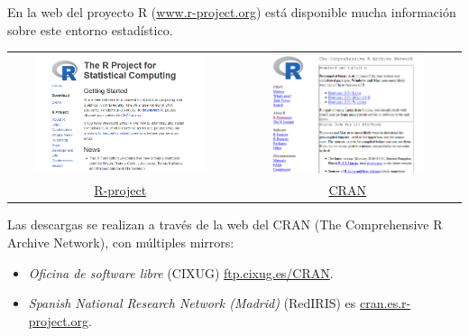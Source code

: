 \documentclass[]{book}
\providecommand{\tightlist}{%
  \setlength{\itemsep}{0pt}\setlength{\parskip}{0pt}}
\begin{document}
En la web del proyecto R
(\href{http://www.r-project.org}{www.r-project.org}) está disponible
mucha información sobre este entorno estadístico.

\begin{longtable}[]{@{}cc@{}}
\toprule
\endhead
\includegraphics[width=0.8\textwidth,height=\textheight]{figuras/rproject.png} & \includegraphics[width=0.7\textwidth,height=\textheight]{figuras/cran.png}\tabularnewline
\href{https://r-project.org}{R-project} & \href{https://cran.r-project.org}{CRAN}\tabularnewline
\bottomrule
\end{longtable}

Las descargas se realizan a través de la web del CRAN (The Comprehensive
R Archive Network), con múltiples mirrors:

\begin{itemize}
\tightlist
\item
  \emph{Oficina de software libre} (CIXUG) \href{http://ftp.cixug.es/CRAN/}{ftp.cixug.es/CRAN}.
\item
  \emph{Spanish National Research Network (Madrid)} (RedIRIS) es
  \href{http://cran.es.r-project.org/}{cran.es.r-project.org}.
\end{itemize}
\end{document}
